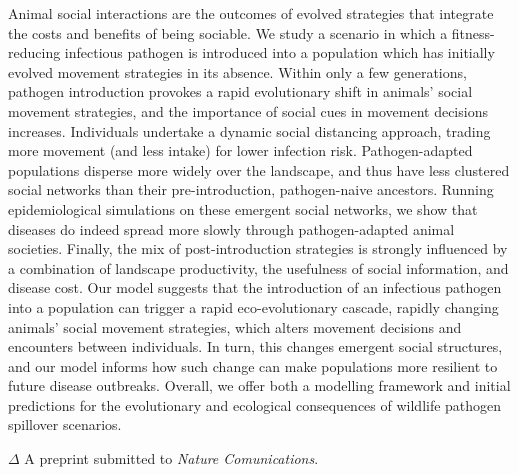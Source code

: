 {
    Animal social interactions are the outcomes of evolved strategies that integrate the costs and benefits of being sociable.
    We study a scenario in which a fitness-reducing infectious pathogen is introduced into a population which has initially evolved movement strategies in its absence.
    Within only a few generations, pathogen introduction provokes a rapid evolutionary shift in animals' social movement strategies, and the importance of social cues in movement decisions increases.
    Individuals undertake a dynamic social distancing approach, trading more movement (and less intake) for lower infection risk.
    Pathogen-adapted populations disperse more widely over the landscape, and thus have less clustered social networks than their pre-introduction, pathogen-naive ancestors.
    Running epidemiological simulations on these emergent social networks, we show that diseases do indeed spread more slowly through pathogen-adapted animal societies.
    Finally, the mix of post-introduction strategies is strongly influenced by a combination of landscape productivity, the usefulness of social information, and disease cost.
    Our model suggests that the introduction of an infectious pathogen into a population can trigger a rapid eco-evolutionary cascade, rapidly changing animals' social movement strategies, which alters movement decisions and encounters between individuals. 
    In turn, this changes emergent social structures, and our model informs how such change can make populations more resilient to future disease outbreaks.
    Overall, we offer both a modelling framework and initial predictions for the evolutionary and ecological consequences of wildlife pathogen spillover scenarios.

    \bigskip

    {\noindent \large{$\Delta$}} A preprint submitted to \textit{Nature Comunications}.
}

\clearpage